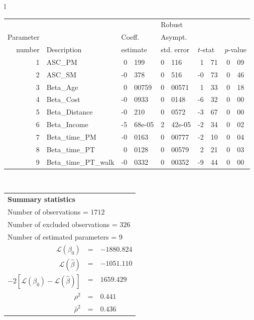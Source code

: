   \begin{tabular}{l}
\begin{tabular}{rlr@{.}lr@{.}lr@{.}lr@{.}l}
         &                       &   \multicolumn{2}{l}{}    & \multicolumn{2}{l}{Robust}  &     \multicolumn{4}{l}{}   \\
Parameter &                       &   \multicolumn{2}{l}{Coeff.}      & \multicolumn{2}{l}{Asympt.}  &     \multicolumn{4}{l}{}   \\
number &  Description                     &   \multicolumn{2}{l}{estimate}      & \multicolumn{2}{l}{std. error}  &   \multicolumn{2}{l}{$t$-stat}  &   \multicolumn{2}{l}{$p$-value}   \\

\hline

1 & ASC_PM  & 0&199 & 0&116 & 1&71 & 0&09\\
2 & ASC_SM & -0&378 & 0&516 & -0&73 & 0&46\\
3 & Beta_Age & 0&00759 & 0&00571 & 1&33 & 0&18\\
4 & Beta_Cost & -0&0933 & 0&0148 & -6&32 & 0&00\\
5 & Beta_Distance & -0&210 & 0&0572 & -3&67 & 0&00\\
6 & Beta_Income & -5&68e-05 & 2&42e-05 & -2&34 & 0&02\\
7 & Beta_time_PM & -0&0163 & 0&00777 & -2&10 & 0&04\\
8 & Beta_time_PT & 0&0128 & 0&00579 & 2&21 & 0&03\\
9 & Beta_time_PT_walk & -0&0332 & 0&00352 & -9&44 & 0&00\\
\hline
\end{tabular}
\\
\begin{tabular}{rcl}
\multicolumn{3}{l}{\bf Summary statistics}\\
\multicolumn{3}{l}{ Number of observations = $1712$} \\
\multicolumn{3}{l}{ Number of excluded observations = $326$} \\
\multicolumn{3}{l}{ Number of estimated  parameters = $9$} \\
 $\mathcal{L}(\beta_0)$ &=&  $-1880.824$ \\
 $\mathcal{L}(\hat{\beta})$ &=& $-1051.110 $  \\
 $-2[\mathcal{L}(\beta_0) -\mathcal{L}(\hat{\beta})]$ &=& $1659.429$ \\
    $\rho^2$ &=&   $0.441$ \\
    $\bar{\rho}^2$ &=&    $0.436$ \\
\end{tabular}
  \end{tabular}
